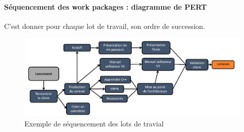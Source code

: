 \paragraph*{Séquencement des work packages : diagramme de PERT}
C'est donner pour chaque lot de travail, son ordre de succession.
\begin{figure}[!h]
	\begin{center}
		\includegraphics[scale=0.2]{images/exemple_sequencement_lots.png}
		\caption{Exemple de séquencement des lots de travial}
	\end{center}
\end{figure}
